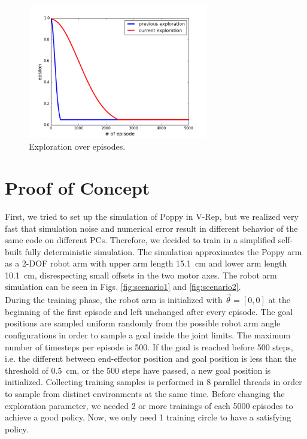 \documentclass{article}
\begin{document}
\begin{figure}
	\centering
	\includegraphics[width=0.7\textwidth]{reportpics/epsilon.png}
	\caption{Exploration over episodes. }
	\label{fig:epsilon}
\end{figure}


\section{Proof of Concept}
First, we tried to set up the simulation of Poppy in V-Rep, but we realized very fast that simulation noise and numerical error result in different behavior of the same code on different PCs. Therefore, we decided to train in a simplified self-built fully deterministic simulation. The simulation approximates the Poppy arm as a 2-DOF robot arm with upper arm length 15.1~cm and lower arm length 10.1~cm, disrespecting small offsets in the two motor axes. The robot arm simulation can be seen in Figs. \ref{fig:scenario1} and \ref{fig:scenario2}. \\
During the training phase, the robot arm is initialized with $\vec{\theta} = [0,0]$ at the beginning of the first episode and left unchanged after every episode. The goal positions are sampled uniform randomly from the possible robot arm angle configurations in order to sample a goal inside the joint limits. The maximum number of timesteps per episode is 500. If the goal is reached before 500 steps, i.e. the different between end-effector position and goal position is less than the threshold of 0.5~cm, or the 500 steps have passed, a new goal position is initialized. Collecting training samples is performed in 8 parallel threads in order to sample from distinct environments at the same time. Before changing the exploration parameter, we needed 2 or more trainings of each 5000 episodes to achieve a good policy. Now, we only need 1 training circle to have a satisfying policy.
\end{document}
